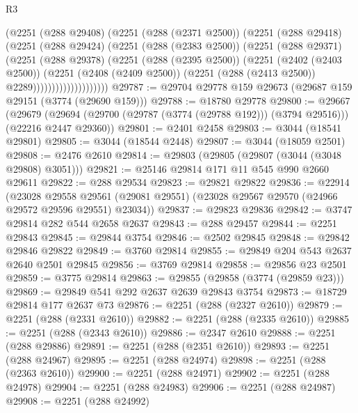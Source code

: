 \begin{lexlean}{R3}
\begin{coremodule}
                      (@2251
                        (@288 @29408)
                        (@2251
                          (@288 (@2371 @2500))
                          (@2251
                            (@288 @29418)
                            (@2251
                              (@288 @29424)
                              (@2251
                                (@288 (@2383 @2500))
                                (@2251
                                  (@288 @29371)
                                  (@2251
                                    (@288 @29378)
                                    (@2251
                                      (@288 (@2395 @2500))
                                      (@2251
                                        (@2402 (@2403 @2500))
                                        (@2251
                                          (@2408 (@2409 @2500))
                                          (@2251 (@288 (@2413 @2500)) @2289))))))))))))))))))))
@29787 := @29704 @29778 @159 @29673 (@29687 @159 @29151 (@3774 (@29690 @159)))
@29788 := @18780 @29778
@29800 := @29667
    (@29679 (@29694 (@29700 (@29787 (@3774 (@29788 @192))) (@3794 @29516))) (@22216 @2447 @29360))
@29801 := @2401 @2458
@29803 := @3044 (@18541 @29801)
@29805 := @3044 (@18544 @2448)
@29807 := @3044 (@18059 @2501)
@29808 := @2476 @2610
@29814 := @29803 (@29805 (@29807 (@3044 (@3048 @29808) @3051)))
@29821 := @25146 @29814 @171 @11 @545 @990 @2660 @29611
@29822 := @288 @29534
@29823 := @29821 @29822
@29836 := @22914
    (@23028
      @29558
      @29561
      (@29081 @29551)
      (@23028 @29567 @29570 (@24966 @29572 @29596 @29551) @23034))
@29837 := @29823 @29836
@29842 := @3747 @29814 @282 @544 @2658 @2637
@29843 := @288 @29457
@29844 := @2251 @29843
@29845 := @29844 @3754
@29846 := @2502 @29845
@29848 := @29842 @29846 @29822
@29849 := @3760 @29814
@29855 := @29849 @204 @543 @2637 @2640 @2501 @29845
@29856 := @3769 @29814
@29858 := @29856 @23 @2501
@29859 := @3775 @29814
@29863 := @29855 (@29858 (@3774 (@29859 @23)))
@29869 := @29849 @541 @292 @2637 @2639 @29843 @3754
@29873 := @18729 @29814 @177 @2637 @73
@29876 := @2251 (@288 (@2327 @2610))
@29879 := @2251 (@288 (@2331 @2610))
@29882 := @2251 (@288 (@2335 @2610))
@29885 := @2251 (@288 (@2343 @2610))
@29886 := @2347 @2610
@29888 := @2251 (@288 @29886)
@29891 := @2251 (@288 (@2351 @2610))
@29893 := @2251 (@288 @24967)
@29895 := @2251 (@288 @24974)
@29898 := @2251 (@288 (@2363 @2610))
@29900 := @2251 (@288 @24971)
@29902 := @2251 (@288 @24978)
@29904 := @2251 (@288 @24983)
@29906 := @2251 (@288 @24987)
@29908 := @2251 (@288 @24992)

\end{coremodule}
\end{lexlean}
